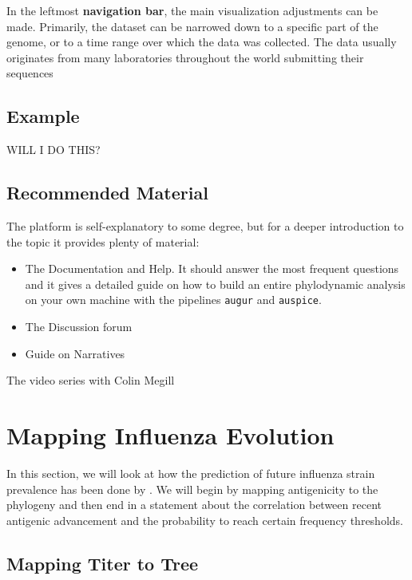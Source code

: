 \documentclass[12pt]{scrartcl}
\begin{document}
  In the leftmost \textbf{navigation bar}, the main visualization adjustments can be made. Primarily, the dataset can be narrowed down to a specific part of the genome, or to a time range over which the data was collected. The data usually originates from many laboratories throughout the world submitting their sequences





  \subsection{Example}

  WILL I DO THIS?

  \subsection{Recommended Material}

    The platform is self-explanatory to some degree, but for a deeper introduction to the topic it provides plenty of material:
\begin{itemize}
  \item The Documentation and Help. It should answer the most frequent questions and it gives a detailed guide on how to build an entire phylodynamic analysis on your own machine with the pipelines \verb|augur| and \verb|auspice|.
  \item The Discussion forum

  \item Guide on Narratives
\end{itemize}

  The video series with Colin Megill

\section{Mapping Influenza Evolution} \label{prediction}

  In this section, we will look at how the prediction of future influenza strain prevalence has been done by \cite{neherBedford+16}. We will begin by mapping antigenicity to the phylogeny and then end in a statement about the correlation between recent antigenic advancement and the probability to reach certain frequency thresholds.

  \subsection{Mapping Titer to Tree}
\end{document}
